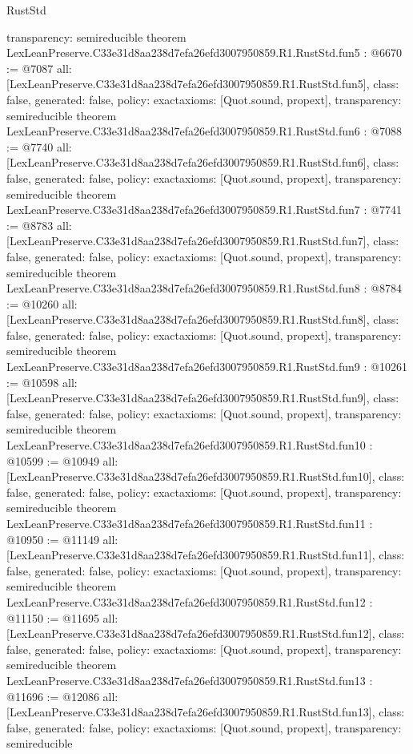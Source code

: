 \begin{lexlean}{RustStd}
\begin{coremodule}
{  transparency: semireducible
}
theorem LexLeanPreserve.C33e31d8aa238d7efa26efd3007950859.R1.RustStd.fun5 : @6670 := @7087 {
  all: [LexLeanPreserve.C33e31d8aa238d7efa26efd3007950859.R1.RustStd.fun5],
  class: false,
  generated: false,
  policy: exact{axioms: [Quot.sound, propext]},
  transparency: semireducible
}
theorem LexLeanPreserve.C33e31d8aa238d7efa26efd3007950859.R1.RustStd.fun6 : @7088 := @7740 {
  all: [LexLeanPreserve.C33e31d8aa238d7efa26efd3007950859.R1.RustStd.fun6],
  class: false,
  generated: false,
  policy: exact{axioms: [Quot.sound, propext]},
  transparency: semireducible
}
theorem LexLeanPreserve.C33e31d8aa238d7efa26efd3007950859.R1.RustStd.fun7 : @7741 := @8783 {
  all: [LexLeanPreserve.C33e31d8aa238d7efa26efd3007950859.R1.RustStd.fun7],
  class: false,
  generated: false,
  policy: exact{axioms: [Quot.sound, propext]},
  transparency: semireducible
}
theorem LexLeanPreserve.C33e31d8aa238d7efa26efd3007950859.R1.RustStd.fun8 : @8784 := @10260 {
  all: [LexLeanPreserve.C33e31d8aa238d7efa26efd3007950859.R1.RustStd.fun8],
  class: false,
  generated: false,
  policy: exact{axioms: [Quot.sound, propext]},
  transparency: semireducible
}
theorem LexLeanPreserve.C33e31d8aa238d7efa26efd3007950859.R1.RustStd.fun9 : @10261 := @10598 {
  all: [LexLeanPreserve.C33e31d8aa238d7efa26efd3007950859.R1.RustStd.fun9],
  class: false,
  generated: false,
  policy: exact{axioms: [Quot.sound, propext]},
  transparency: semireducible
}
theorem LexLeanPreserve.C33e31d8aa238d7efa26efd3007950859.R1.RustStd.fun10 : @10599 := @10949 {
  all: [LexLeanPreserve.C33e31d8aa238d7efa26efd3007950859.R1.RustStd.fun10],
  class: false,
  generated: false,
  policy: exact{axioms: [Quot.sound, propext]},
  transparency: semireducible
}
theorem LexLeanPreserve.C33e31d8aa238d7efa26efd3007950859.R1.RustStd.fun11 : @10950 := @11149 {
  all: [LexLeanPreserve.C33e31d8aa238d7efa26efd3007950859.R1.RustStd.fun11],
  class: false,
  generated: false,
  policy: exact{axioms: [Quot.sound, propext]},
  transparency: semireducible
}
theorem LexLeanPreserve.C33e31d8aa238d7efa26efd3007950859.R1.RustStd.fun12 : @11150 := @11695 {
  all: [LexLeanPreserve.C33e31d8aa238d7efa26efd3007950859.R1.RustStd.fun12],
  class: false,
  generated: false,
  policy: exact{axioms: [Quot.sound, propext]},
  transparency: semireducible
}
theorem LexLeanPreserve.C33e31d8aa238d7efa26efd3007950859.R1.RustStd.fun13 : @11696 := @12086 {
  all: [LexLeanPreserve.C33e31d8aa238d7efa26efd3007950859.R1.RustStd.fun13],
  class: false,
  generated: false,
  policy: exact{axioms: [Quot.sound, propext]},
  transparency: semireducible
}
\end{coremodule}
\end{lexlean}
